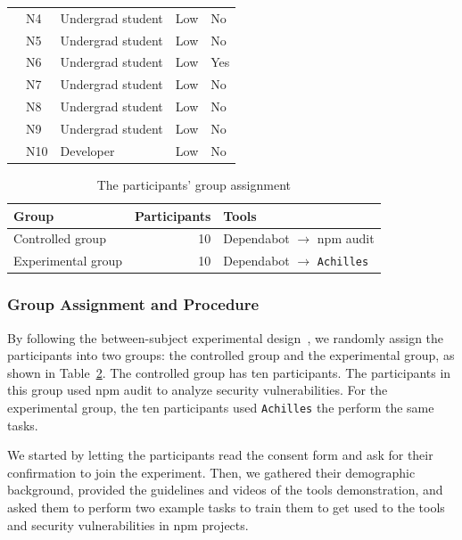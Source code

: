 \documentclass[conference]{IEEEtran}
\begin{document}
\begin{table}[tb]
{\begin{tabular}{lllp{1.1cm}p{1.1cm}}
				& N4                                          & Undergrad student & Low & No \\
				& N5                                          & Undergrad student & Low & No \\
				& N6                                          & Undergrad student & Low & Yes \\
				& N7                                          & Undergrad student & Low & No \\
				& N8                                          & Undergrad student & Low & No \\
				& N9                                          & Undergrad student & Low & No \\
				& N10                                         & Developer & Low & No \\
				\bottomrule
			\end{tabular}
		}
		\label{table:participants}
	\end{table}
	
	\begin{table}[tb]
		\centering
		\caption{The participants' group assignment}
		\begin{tabular}{lrl}
			\toprule
			Group & Participants & Tools \\
			\midrule
			Controlled group & 10 & Dependabot $\rightarrow$ npm audit \\
			\midrule
			Experimental group & 10 & Dependabot $\rightarrow$ \texttt{Achilles} \\
			\bottomrule
		\end{tabular}
		\label{table:group_assignment}
	\end{table}
	
	\subsubsection{Group Assignment and Procedure}
	By following the between-subject experimental design~\citep{Charness2012}, we randomly assign the participants into two groups: the controlled group and the experimental group, as shown in Table~\ref{table:group_assignment}. The controlled group has ten participants. The participants in this group used npm audit to analyze security vulnerabilities. For the experimental group, the ten participants used \texttt{Achilles} the perform the same tasks. 
	
	We started by letting the participants read the consent form and ask for their confirmation to join the experiment. Then, we gathered their demographic background, provided the guidelines and videos of the tools demonstration, and asked them to perform two example tasks to train them to get used to the tools and security vulnerabilities in npm projects.
	
\end{document}
